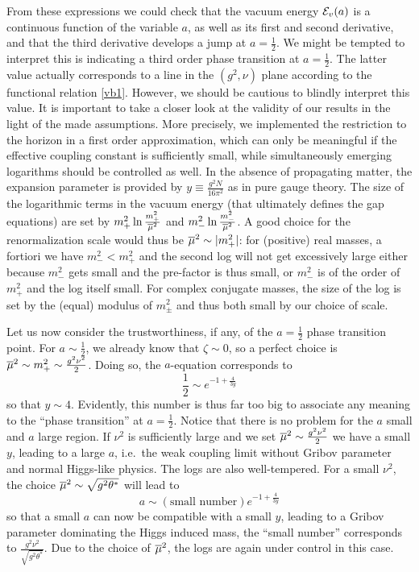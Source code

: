 From these expressions we could check that the vacuum energy ${\cal E}_v(a)$ is a continuous  function of the variable $a$, as well as its first and second derivative, and that the third derivative develops a jump at $a=\frac{1}{2}$. We might be tempted to interpret this is indicating a third order phase transition at $a=\frac{1}{2}$. The latter value actually corresponds to a line in the $(g^2,\nu)$ plane according to the functional relation \eqref{vb1}. However, we should be cautious to blindly interpret this value. It is important to take a closer look at the validity of our results in the light of the made assumptions. More precisely, we implemented the restriction to the horizon in a first order approximation, which can only be meaningful if the effective coupling constant is sufficiently small, while simultaneously emerging logarithms should be controlled as well. In the absence of propagating matter, the expansion parameter is provided by $y\equiv\frac{g^2N}{16\pi^2}$ as in pure gauge theory. The size of the logarithmic terms in the vacuum energy (that ultimately defines the gap equations) are set by $m_+^2\ln\frac{m_+^2}{\overline{\mu}^2}$ and $m_-^2\ln\frac{m_-^2}{\overline{\mu}^2}$. A good choice for the renormalization scale would thus be $\overline{\mu}^2\sim |m_+^2|$: for (positive) real masses, a fortiori we have $m_-^2<m_+^2$ and the second log will not get excessively large either because $m_-^2$ gets small and the pre-factor is thus small, or $m_-^2$ is of the order of $m_+^2$ and the log itself small. For complex conjugate masses, the size of the log is set by the (equal) modulus of $m_\pm^2$ and thus both small by our choice of scale.

Let us now consider the trustworthiness, if any, of the $a=\frac{1}{2}$ phase transition point.  For $a\sim\frac{1}{2}$, we already know that $\zeta\sim 0$, so a perfect choice is $\overline{\mu}^2\sim m_+^2\sim\frac{g^2\nu^2}{2}$. Doing so, the $a$-equation corresponds to
\begin{equation}\label{aeq}
    \frac{1}{2}\sim e^{-1+\frac{4}{3y}}
\end{equation}
so that $y\sim 4$. Evidently, this number is thus far too big to associate any meaning to the ``phase transition'' at $a=\frac{1}{2}$. Notice that there is no problem for the $a$ small and $a$ large region. If $\nu^2$ is sufficiently large and we set $\overline{\mu}^2\sim \frac{g^2\nu^2}{2}$ we have a small $y$, leading to a large $a$, i.e.~the weak coupling limit without Gribov parameter and normal Higgs-like physics. The logs are also well-tempered.    For a small $\nu^2$, the choice $\overline{\mu}^2\sim\sqrt{g^2\theta^*}$ will lead to
\begin{equation}\label{aeq2}
a\sim (\textrm{small number})e^{-1+\frac{4}{3y}}
\end{equation}
so that a small $a$  can now be compatible with a small $y$, leading to a Gribov parameter dominating the Higgs induced mass, the ``small number'' corresponds to $\frac{g^2\nu^2}{\sqrt{g^2\theta^*}}$. Due to the choice of $\overline{\mu}^2$, the logs are again under control in this case.

